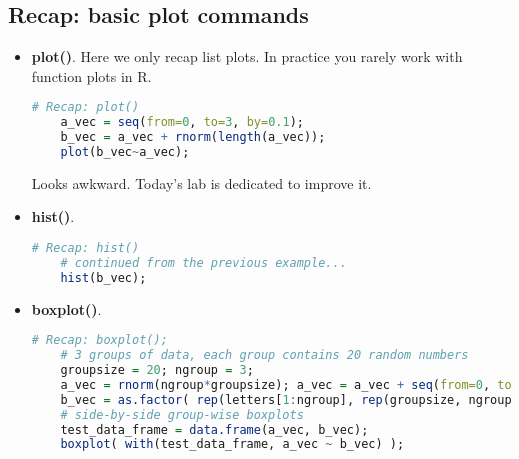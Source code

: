 \documentclass[10pt]{article}
\begin{document}
\subsection{Recap: basic plot commands}
\begin{itemize}
	\item {\bf plot()}. Here we only recap list plots. In practice you rarely work with function plots in R.
\begin{lstlisting}[style=displaycode, language=R]
	# Recap: plot()
	a_vec = seq(from=0, to=3, by=0.1);
	b_vec = a_vec + rnorm(length(a_vec));
	plot(b_vec~a_vec);
\end{lstlisting}
	Looks awkward. Today's lab is dedicated to improve it.
	\item {\bf hist()}.
\begin{lstlisting}[style=displaycode, language=R]
	# Recap: hist()
	# continued from the previous example...
	hist(b_vec);
\end{lstlisting}
	\item {\bf boxplot()}.
\begin{lstlisting}[style=displaycode, language=R]
	# Recap: boxplot();
	# 3 groups of data, each group contains 20 random numbers
	groupsize = 20; ngroup = 3;
	a_vec = rnorm(ngroup*groupsize); a_vec = a_vec + seq(from=0, to=5, length.out=length(a_vec));
	b_vec = as.factor( rep(letters[1:ngroup], rep(groupsize, ngroup)) );
	# side-by-side group-wise boxplots
	test_data_frame = data.frame(a_vec, b_vec);
	boxplot( with(test_data_frame, a_vec ~ b_vec) );
\end{lstlisting}
\end{itemize}
\end{document}
